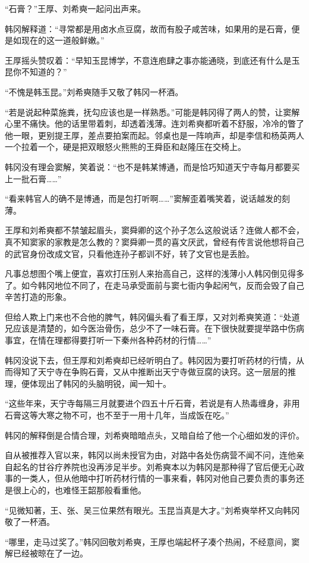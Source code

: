 “石膏？”王厚、刘希奭一起问出声来。

韩冈解释道：“寻常都是用卤水点豆腐，故而有股子咸苦味，如果用的是石膏，便是如现在的这一道般鲜嫩。”

王厚摇头赞叹着：“早知玉昆博学，不意连庖肆之事亦能通晓，到底还有什么是玉昆你不知道的？”

“不愧是韩玉昆。”刘希奭随手又敬了韩冈一杯酒。

“若是说起种菜施粪，抚勾应该也是一样熟悉。”可能是韩冈得了两人的赞，让窦解心里不痛快。他的话里带着刺，却透着浅薄。连刘希奭都听着不舒服，冷冷的瞥了他一眼，更别提王厚，差点要拍案而起。邻桌也是一阵响声，却是李信和杨英两人一个拉着一个，硬是把双眼怒火熊熊的王舜臣和赵隆压在交椅上。

韩冈没有理会窦解，笑着说：“也不是韩某博通，而是恰巧知道天宁寺每月都要买上一批石膏……”

“看来韩官人的确不是博通，而是包打听啊……”窦解歪着嘴笑着，说话越发的刻薄。

王厚和刘希奭都不禁皱起眉头，窦舜卿的这个孙子怎么这般说话？连做人都不会，真不知窦家的家教是怎么教的？窦舜卿一贯的喜文厌武，曾经有传言说他想将自己的武官身份改成文官，只看他连孙子都训不好，转了文官也是丢脸。

凡事总想图个嘴上便宜，喜欢打压别人来抬高自己，这样的浅薄小人韩冈倒见得多了。如今韩冈地位不同了，在走马承受面前与窦七衙内争起闲气，反而会毁了自己辛苦打造的形象。

但给人欺上门来也不合他的脾气，韩冈偏头看了看王厚，又对刘希奭笑道：“处道兄应该是清楚的，如今医治骨伤，总少不了一味石膏。在下很快就要提举路中伤病事宜，在情在理都得要打听一下秦州各种药材的行情……”

韩冈没说下去，但王厚和刘希奭却已经听明白了。韩冈因为要打听药材的行情，从而得知了天宁寺在争购石膏，又从中推断出天宁寺做豆腐的诀窍。这一层层的推理，便体现出了韩冈的头脑明锐，闻一知十。

“这些年来，天宁寺每隔三月就要进个四五十斤石膏，若说是有人热毒缠身，非用石膏这等大寒之物不可，也不至于一用十几年，当成饭在吃。”

韩冈的解释倒是合情合理，刘希奭暗暗点头，又暗自给了他一个心细如发的评价。

自从被推荐入官以来，韩冈以尚未授官为由，对路中各处伤病营不闻不问，连他亲自起名的甘谷疗养院也没再涉足半步。刘希奭本以为韩冈是那种得了官后便无心政事的一类人，但从他暗中打听药材行情的一事来看，韩冈对他自己要负责的事务还是很上心的，也难怪王韶那般看重他。

“见微知著，王、张、吴三位果然有眼光。玉昆当真是大才。”刘希奭举杯又向韩冈敬了一杯酒。

“哪里，走马过奖了。”韩冈回敬刘希奭，王厚也端起杯子凑个热闹，不经意间，窦解已经被晾在了一边。

